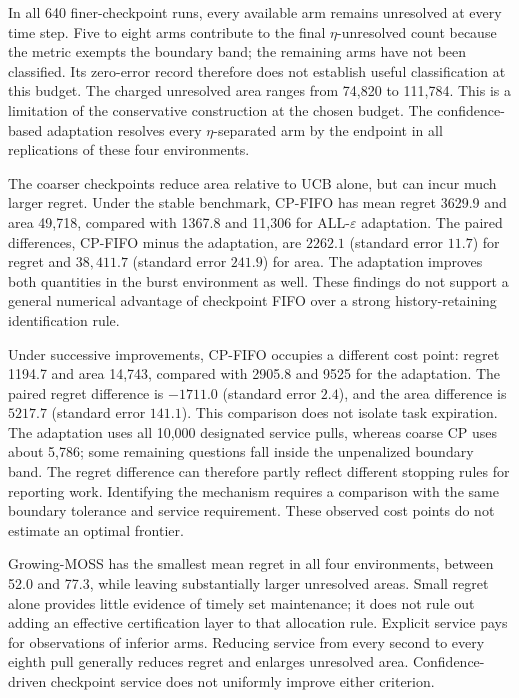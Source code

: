 \documentclass[11pt]{article}
\begin{document}
In all 640 finer-checkpoint runs, every available arm remains unresolved
at every time step. Five to eight arms contribute to the final
$\eta$-unresolved count because the metric exempts the boundary band;
the remaining arms have not been classified. Its zero-error record
therefore does not establish useful classification at this budget.
The charged unresolved area ranges from 74,820 to 111,784. This is a
limitation of the conservative construction at the chosen budget.
The confidence-based adaptation resolves every $\eta$-separated arm by
the endpoint in all replications of these four environments.

The coarser checkpoints reduce area relative to UCB alone, but can incur
much larger regret. Under the stable benchmark, CP-FIFO has mean regret
3629.9 and area 49,718, compared with 1367.8 and 11,306 for
ALL-$\varepsilon$ adaptation. The paired differences, CP-FIFO minus the
adaptation, are $2262.1$ (standard error $11.7$) for regret and
$38{,}411.7$ (standard error $241.9$) for area. The adaptation improves
both quantities in the burst environment as well. These findings do not
support a general numerical advantage of checkpoint FIFO over a strong
history-retaining identification rule.

Under successive improvements, CP-FIFO occupies a different cost point:
regret 1194.7 and area 14,743, compared with 2905.8 and 9525 for the
adaptation. The paired regret difference is $-1711.0$ (standard error
$2.4$), and the area difference is $5217.7$ (standard error $141.1$).
This comparison does not isolate task expiration. The adaptation uses
all 10,000 designated service pulls, whereas coarse CP uses about 5,786;
some remaining questions fall inside the unpenalized boundary band.
The regret difference can therefore partly reflect different stopping
rules for reporting work. Identifying the mechanism requires a comparison
with the same boundary tolerance and service requirement. These observed
cost points do not estimate an optimal frontier.

Growing-MOSS has the smallest mean regret in all four environments,
between 52.0 and 77.3, while leaving substantially larger unresolved
areas. Small regret alone provides little evidence of timely set
maintenance; it does not rule out adding an effective certification
layer to that allocation rule. Explicit service pays for observations of
inferior arms. Reducing service from every second to every eighth pull
generally reduces regret and enlarges unresolved area. Confidence-driven
checkpoint service does not uniformly improve either criterion.
\end{document}
